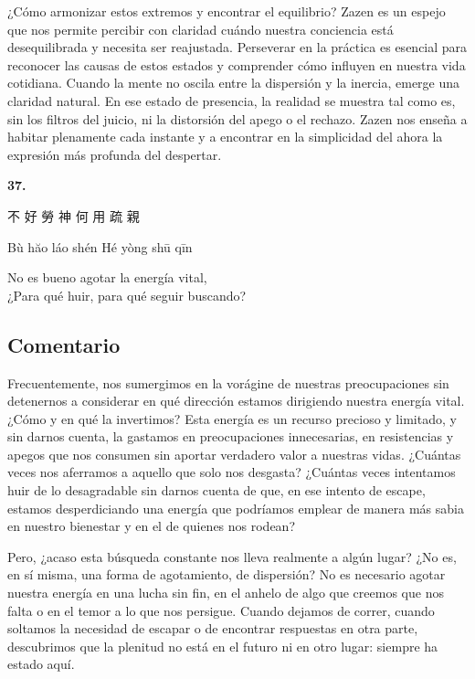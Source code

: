 \documentclass[
  a5paperpaper,
]{article}
\begin{document}
¿Cómo armonizar estos extremos y encontrar el equilibrio? Zazen es un
espejo que nos permite percibir con claridad cuándo nuestra conciencia
está desequilibrada y necesita ser reajustada. Perseverar en la práctica
es esencial para reconocer las causas de estos estados y comprender cómo
influyen en nuestra vida cotidiana. Cuando la mente no oscila entre la
dispersión y la inercia, emerge una claridad natural. En ese estado de
presencia, la realidad se muestra tal como es, sin los filtros del
juicio, ni la distorsión del apego o el rechazo. Zazen nos enseña a
habitar plenamente cada instante y a encontrar en la simplicidad del
ahora la expresión más profunda del despertar.

\hfill\break

\hypertarget{02}{}
\begin{verseblock}

\newpage

\begin{center}\textbf{37.}\end{center}

不 好 勞 神 何 用 疏 親

Bù hăo láo shén Hé yòng shū qīn

No es bueno agotar la energía vital,\\
¿Para qué huir, para qué seguir buscando?

\end{verseblock}

\hfill\break

\hypertarget{comentario-36}{%
\subsection{Comentario}\label{comentario-36}}

Frecuentemente, nos sumergimos en la vorágine de nuestras preocupaciones
sin detenernos a considerar en qué dirección estamos dirigiendo nuestra
energía vital. ¿Cómo y en qué la invertimos? Esta energía es un recurso
precioso y limitado, y sin darnos cuenta, la gastamos en preocupaciones
innecesarias, en resistencias y apegos que nos consumen sin aportar
verdadero valor a nuestras vidas. ¿Cuántas veces nos aferramos a aquello
que solo nos desgasta? ¿Cuántas veces intentamos huir de lo desagradable
sin darnos cuenta de que, en ese intento de escape, estamos
desperdiciando una energía que podríamos emplear de manera más sabia en
nuestro bienestar y en el de quienes nos rodean?

Pero, ¿acaso esta búsqueda constante nos lleva realmente a algún lugar?
¿No es, en sí misma, una forma de agotamiento, de dispersión? No es
necesario agotar nuestra energía en una lucha sin fin, en el anhelo de
algo que creemos que nos falta o en el temor a lo que nos persigue.
Cuando dejamos de correr, cuando soltamos la necesidad de escapar o de
encontrar respuestas en otra parte, descubrimos que la plenitud no está
en el futuro ni en otro lugar: siempre ha estado aquí.
\end{document}

